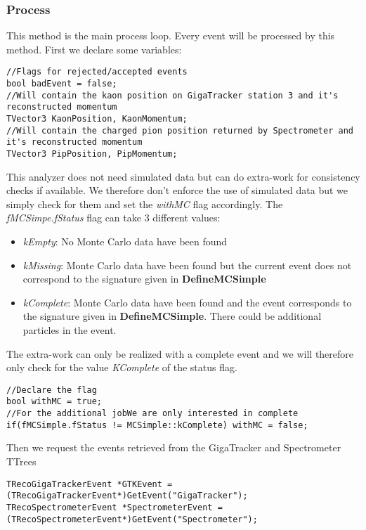 \documentclass{article}
\newcommand{\method}[1]{\textbf{#1}}
\newcommand{\var}[1]{\textit{#1}}
\begin{document}
\subsubsection{Process}
This method is the main process loop. Every event will be processed by this method. First we declare
some variables:
\begin{lstlisting}
//Flags for rejected/accepted events
bool badEvent = false;
//Will contain the kaon position on GigaTracker station 3 and it's reconstructed momentum
TVector3 KaonPosition, KaonMomentum;
//Will contain the charged pion position returned by Spectrometer and it's reconstructed momentum 
TVector3 PipPosition, PipMomentum;
\end{lstlisting}

This analyzer does not need simulated data but can do extra-work for consistency checks if
available. We therefore don't enforce the use of simulated data but we simply check for them and
set the \var{withMC} flag accordingly. The \var{fMCSimpe.fStatus} flag can take 3 different values:
\begin{itemize}
  \item \var{kEmpty}: No Monte Carlo data have been found
  \item \var{kMissing}: Monte Carlo data have been found but the current event does not correspond
  to the signature given in \method{DefineMCSimple} 
  \item \var{kComplete}: Monte Carlo data have been found and the event corresponds to the signature
  given in \method{DefineMCSimple}. There could be additional particles in the event.
\end{itemize}
The extra-work can only be realized with a complete event and we will therefore only check for the
value \var{KComplete} of the status flag.

\begin{lstlisting}
//Declare the flag
bool withMC = true;
//For the additional jobWe are only interested in complete 
if(fMCSimple.fStatus != MCSimple::kComplete) withMC = false;
\end{lstlisting}

Then we request the events retrieved from the GigaTracker and Spectrometer TTrees
\begin{lstlisting}
TRecoGigaTrackerEvent *GTKEvent = (TRecoGigaTrackerEvent*)GetEvent("GigaTracker");
TRecoSpectrometerEvent *SpectrometerEvent = (TRecoSpectrometerEvent*)GetEvent("Spectrometer");
\end{lstlisting}
\end{document}
